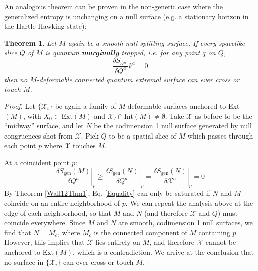 \documentclass[12pt]{article}
\newtheorem{thm}{Theorem}[section]
\theoremstyle{remark}
\numberwithin{equation}{section}
\numberwithin{equation}{section}
\begin{document}
An analogous theorem can be proven in the non-generic case where the generalized entropy is unchanging on a null surface (e.g. a stationary horizon in the Hartle-Hawking state):

\begin{thm} \label{ZeroBarrier}Let $M$ again be a smooth null splitting surface.  If every spacelike slice $Q$ of $M$ is quantum {\bf marginally} trapped, i.e. for any point $q$ on $Q$,
\begin{equation} \frac{\delta S_\mathrm{gen}}{\delta Q^{a}}k^{a}=0\end{equation}
\noindent then no $M$-deformable connected quantum extremal surface can ever cross or touch $M$.\end{thm}
\begin{proof} 
Let $\{\mathcal{X}_{i}\}$ be again a family of $M$-deformable surfaces anchored to Ext$(M)$, with $X_{0}\subset\text{Ext}(M)$ and $\mathcal{X}_{I}\cap\text{Int}(M)\neq \emptyset$. Take $\mathcal{X}$ as before to be the ``midway'' surface, and let $N$ be the codimension 1 null surface generated by null congruences shot from $\mathcal{X}$. Pick $Q$ to be a spatial slice of $M$ 
which passes through each point $p$ where $\mathcal{X}$ touches $M$.  

At a coincident point $p$:
\begin{equation} \left .\frac{\delta S_\mathrm{gen}\left(M\right)}{\delta Q^{a}}\right | _{p} \geq \left .\frac{\delta S_\mathrm{gen}\left(N\right)}{\delta Q^{a}}\right | _{p}= \left .\frac{\delta S_\mathrm{gen}\left(N\right)}{\delta \mathcal{X}^{a}}\right | _{p}=0\label{Equality}\end{equation}
\noindent By Theorem \ref{Wall12Thm1}, Eq. \ref{Equality} can only be saturated if $N$ and $M$ coincide on an entire neighborhood of $p$. We can repeat the analysis above at the edge of each neighborhood, so that $M$ and $N$ (and therefore $\mathcal{X}$ and $Q$) must coincide everywhere. Since $M$ and $N$ are smooth, codimension 1 null surfaces, we find that $N=M_{c}$, where $M_{c}$ is the connected component of $M$ containing $p$. However, this implies that $\mathcal{X}$ lies entirely on $M$, and therefore ${\cal X}$ cannot be anchored to Ext$(M)$, which is a contradiction.  We arrive at the conclusion that no surface in $\{\mathcal{X}_{i}\}$ can ever cross or touch $M$.
\end{proof}
\end{document}
